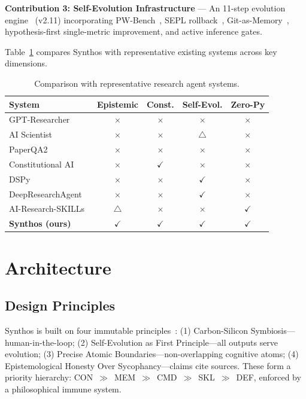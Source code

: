\documentclass[review]{elsarticle}
\begin{document}
\textbf{Contribution 3: Self-Evolution Infrastructure} --- An 11-step evolution engine~\cite{yang2026synthos} (v2.11) incorporating PW-Bench~\cite{song2026paperorchestra}, SEPL rollback~\cite{skyworkai2026deep}, Git-as-Memory~\cite{yang2026aris}, hypothesis-first single-metric improvement, and active inference gates.

Table~\ref{tab:comparison} compares Synthos with representative existing systems across key dimensions.

\begin{table}[h]\centering\caption{Comparison with representative research agent systems.}\label{tab:comparison}
\small
\begin{tabular}{lcccc}\toprule
\textbf{System} & \textbf{Epistemic} & \textbf{Const.} & \textbf{Self-Evol.} & \textbf{Zero-Py}\\\midrule
GPT-Researcher~\cite{elovic2024gpt} & $\times$ & $\times$ & $\times$ & $\times$\\
AI Scientist~\cite{lu2024ai} & $\times$ & $\times$ & $\bigtriangleup$ & $\times$\\
PaperQA2~\cite{futurehouse2025paperqa2} & $\times$ & $\times$ & $\times$ & $\times$\\
Constitutional AI~\cite{bai2022constitutional} & $\times$ & $\checkmark$ & $\times$ & $\times$\\ 
DSPy~\cite{khattab2023dspy} & $\times$ & $\times$ & $\checkmark$ & $\times$\\
DeepResearchAgent~\cite{skyworkai2026deep} & $\times$ & $\times$ & $\checkmark$ & $\times$\\
AI-Research-SKILLs~\cite{orchestra2026airesearch} & $\bigtriangleup$ & $\times$ & $\times$ & $\checkmark$\\
\textbf{Synthos (ours)} & $\checkmark$ & $\checkmark$ & $\checkmark$ & $\checkmark$\\\bottomrule
\end{tabular}
\end{table}

\section{Architecture}

\subsection{Design Principles}

Synthos is built on four immutable principles~\cite{yang2026synthosconst}: (1) Carbon-Silicon Symbiosis---human-in-the-loop; (2) Self-Evolution as First Principle---all outputs serve evolution; (3) Precise Atomic Boundaries---non-overlapping cognitive atoms; (4) Epistemological Honesty Over Sycophancy---claims cite sources. These form a priority hierarchy: CON~$\gg$~MEM~$\gg$~CMD~$\gg$~SKL~$\gg$~DEF, enforced by a philosophical immune system.
\end{document}
